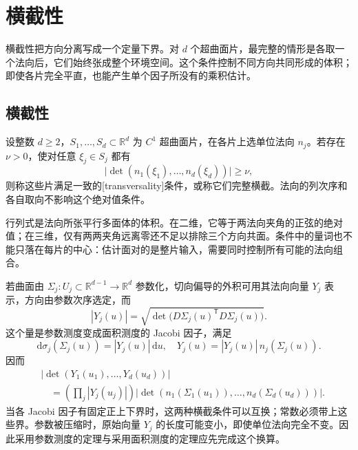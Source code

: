 \section{横截性}
\label{b2:sec:2502}

横截性把方向分离写成一个定量下界。对 \(d\) 个超曲面片，最完整的情形是各取一个法向后，它们始终张成整个环境空间。这个条件控制不同方向共同形成的体积；即使各片完全平直，也能产生单个因子所没有的乘积估计。

\subsection{横截性}
\label{b2:subsec:250201}

\begin{definition}[完整横截的超曲面片]\label{b2:def:25-transversality}
设整数 \(d\geq2\)，\(S_1,\ldots,S_d\subset\mathbb R^d\) 为 \(C^1\) 超曲面片，在各片上选单位法向 \(n_j\)。若存在 \(\nu>0\)，使对任意 \(\xi_j\in S_j\) 都有
\[
 \bigl|\det(n_1(\xi_1),\ldots,n_d(\xi_d))\bigr|\geq\nu,
\]
则称这些片满足一致的[transversality]条件，或称它们完整横截。法向的列次序和各自取向不影响这个绝对值条件。
\end{definition}

行列式是法向所张平行多面体的体积。在二维，它等于两法向夹角的正弦的绝对值；在三维，仅有两两夹角远离零还不足以排除三个方向共面。条件中的量词也不能只落在每片的中心：估计面对的是整片输入，需要同时控制所有可能的法向组合。

\ProseParagraphBreak

若曲面由 \(\Sigma_j:U_j\subset\mathbb R^{d-1}\to\mathbb R^d\) 参数化，切向偏导的外积可用其法向向量 \(Y_j\) 表示，方向由参数次序选定，而
\[
 |Y_j(u)|=
 \sqrt{\det\bigl(D\Sigma_j(u)^{\mathsf T}D\Sigma_j(u)\bigr)}.
\]
这个量是参数测度变成面积测度的 Jacobi 因子，满足
\[
 \mathrm d\sigma_j(\Sigma_j(u))=|Y_j(u)|\,\mathrm du,
 \quad
 Y_j(u)=|Y_j(u)|\,n_j(\Sigma_j(u)).
\]
因而
\[
 \begin{aligned}
 &\bigl|\det(Y_1(u_1),\ldots,Y_d(u_d))\bigr|\\
 &\quad=\left(\prod_j|Y_j(u_j)|\right)
    \bigl|\det(n_1(\Sigma_1(u_1)),\ldots,n_d(\Sigma_d(u_d)))\bigr|.
 \end{aligned}
\]
当各 Jacobi 因子有固定正上下界时，这两种横截条件可以互换；常数必须带上这些界。参数被压缩时，原始向量 \(Y_j\) 的长度可能变小，即使单位法向完全不变。因此采用参数测度的定理与采用面积测度的定理应先完成这个换算。

\ProseParagraphBreak

